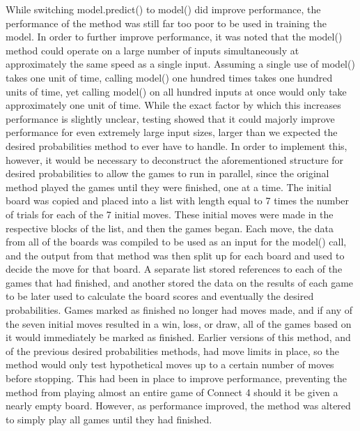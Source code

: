 \documentclass[12pt]{article}
\begin{document}
While switching model.predict() to model() did improve performance, the performance of the method was still far too poor to be used in training the model. In order to further improve performance, it was noted that the model() method could operate on a large number of inputs simultaneously at approximately the same speed as a single input. Assuming a single use of model() takes one unit of time, calling model() one hundred times takes one hundred units of time, yet calling model() on all hundred inputs at once would only take approximately one unit of time. While the exact factor by which this increases performance is slightly unclear, testing showed that it could majorly improve performance for even extremely large input sizes, larger than we expected the desired probabilities method to ever have to handle. In order to implement this, however, it would be necessary to deconstruct the aforementioned structure for desired probabilities to allow the games to run in parallel, since the original method played the games until they were finished, one at a time. The initial board was copied and placed into a list with length equal to 7 times the number of trials for each of the 7 initial moves. These initial moves were made in the respective blocks of the list, and then the games began. Each move, the data from all of the boards was compiled to be used as an input for the model() call, and the output from that method was then split up for each board and used to decide the move for that board. A separate list stored references to each of the games that had finished, and another stored the data on the results of each game to be later used to calculate the board scores and eventually the desired probabilities. Games marked as finished no longer had moves made, and if any of the seven initial moves resulted in a win, loss, or draw, all of the games based on it would immediately be marked as finished. Earlier versions of this method, and of the previous desired probabilities methods, had move limits in place, so the method would only test hypothetical moves up to a certain number of moves before stopping. This had been in place to improve performance, preventing the method from playing almost an entire game of Connect 4 should it be given a nearly empty board. However, as performance improved, the method was altered to simply play all games until they had finished.
\end{document}
